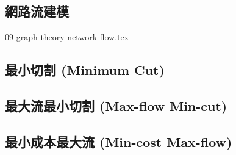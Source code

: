\documentclass[12pt,a4paper,oneside]{report}
\begin{document}
\begin{CJK}{UTF8}{bkai}
\subsection{網路流建模}

{09-graph-theory-network-flow.tex}

\subsection{最小切割 (Minimum Cut)}
\subsection{最大流最小切割 (Max-flow Min-cut)}
\subsection{最小成本最大流 (Min-cost Max-flow)}
\ifx \allfiles \undefined
\printindex[noun]

\clearpage
\end{CJK}
\end{document}
